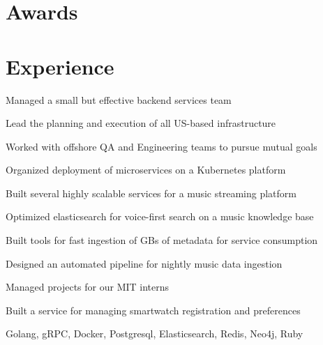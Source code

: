 \documentclass[]{modern}
\begin{document}
\begin{minipage}[t]{0.33\textwidth}
\sectionsep


\section{Awards}

\sectionsep

%
%

\end{minipage}
\hfill
\begin{minipage}[t]{0.66\textwidth}


\section{Experience}


\vspace{\topsep} %
\begin{tightemize}
\item Managed a small but effective backend services team
\item Lead the planning and execution of all US-based infrastructure
\item Worked with offshore QA and Engineering teams to pursue mutual goals
\item Organized deployment of microservices on a Kubernetes platform
\end{tightemize}
\sectionsep


\begin{tightemize}
\item Built several highly scalable services for a music streaming platform
\item Optimized elasticsearch for voice-first search on a music knowledge base
\item Built tools for fast ingestion of GBs of metadata for service consumption
\item Designed an automated pipeline for nightly music data ingestion
\item Managed projects for our MIT interns
\item Built a service for managing smartwatch registration and preferences
\item Golang, gRPC, Docker, Postgresql, Elasticsearch, Redis, Neo4j, Ruby
\end{tightemize}
\sectionsep


\end{minipage}
\end{document}
